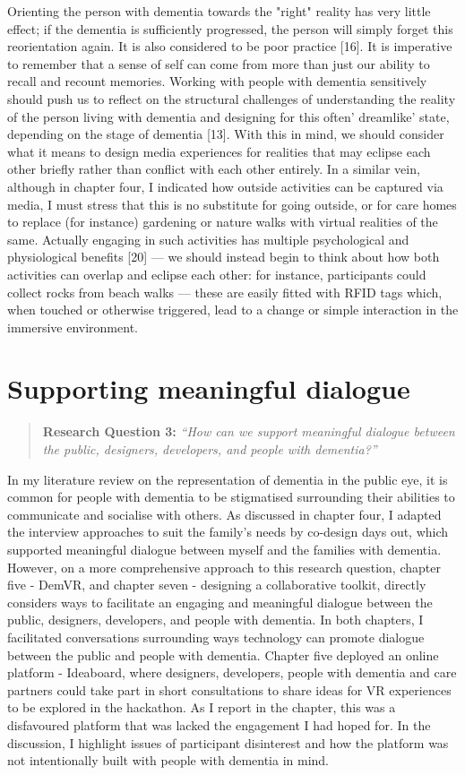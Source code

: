 Orienting the person with dementia towards the "right" reality has very little effect; if the dementia is sufficiently progressed, the person will simply forget this reorientation again. It is also considered to be poor practice [16]. It is imperative to remember that a sense of self can come from more than just our ability to recall and recount memories. Working with people with dementia sensitively should push us to reflect on the structural challenges of understanding the reality of the person living with dementia and designing for this often' dreamlike' state, depending on the stage of dementia [13]. With this in mind, we should consider what it means to design media experiences for realities that may eclipse each other briefly rather than conflict with each other entirely. In a similar vein,  although in chapter four, I indicated how outside activities can be captured via media, I must stress that this is no substitute for going outside, or for care homes to replace (for instance) gardening or nature walks with virtual realities of the same. Actually engaging in such activities has multiple psychological and physiological benefits [20] — we should instead begin to think about how both activities can overlap and eclipse each other: for instance, participants could collect rocks from beach walks — these are easily fitted with RFID tags which, when touched or otherwise triggered, lead to a change or simple interaction in the immersive environment.
\section{Supporting meaningful dialogue}
\label{Discussion:RQ3}
\begin{quote}
\textbf{    Research Question 3:
}    
\textit{    “How can we support meaningful dialogue between the public, designers, developers, and people with dementia?”}
\end{quote}
In my literature review on the representation of dementia in the public eye, it is common for people with dementia to be stigmatised surrounding their abilities to communicate and socialise with others. As discussed in chapter four, I adapted the interview approaches to suit the family's needs by co-design days out, which supported meaningful dialogue between myself and the families with dementia. However, on a more comprehensive approach to this research question, chapter five - DemVR, and chapter seven - designing a collaborative toolkit, directly considers ways to facilitate an engaging and meaningful dialogue between the public, designers, developers, and people with dementia. In both chapters, I facilitated conversations surrounding ways technology can promote dialogue between the public and people with dementia. Chapter five deployed an online platform - Ideaboard, where designers, developers, people with dementia and care partners could take part in short consultations to share ideas for VR experiences to be explored in the hackathon. As I report in the chapter, this was a disfavoured platform that was lacked the engagement I had hoped for. In the discussion, I highlight issues of participant disinterest and how the platform was not intentionally built with people with dementia in mind. 


